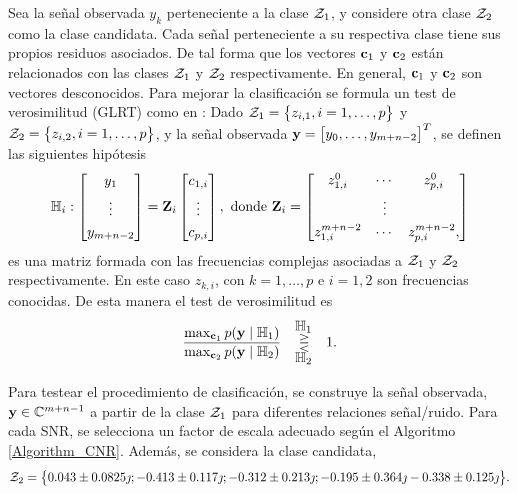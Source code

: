 			Sea la señal observada $y_k$ perteneciente a la clase $\mathcal{Z}_1$, y considere otra clase $\mathcal{Z}_2$ como la clase candidata. Cada señal perteneciente a su respectiva clase tiene sus propios residuos asociados. De tal forma que los vectores $\mathbf{c}_1$ y $\mathbf{c}_2$ están relacionados con las clases $\mathcal{Z}_1$ y $\mathcal{Z}_2$ respectivamente. En general, $\mathbf{c}_1$ y $\mathbf{c}_2$ son vectores desconocidos. Para mejorar la clasificación se formula un test de verosimilitud (GLRT) como en \cite{Mooney1998}: Dado $\mathcal{Z}_1= \big\{
			z_{i,1}, i=1,\ldots,p\big\}$ y $\mathcal{Z}_2= \big\{z_{i,2}, i=1,\ldots,p\big\}$, y la señal observada $\mathbf{y} = \big[y_0,\ldots,y_{m+n-2}\big]^T$, se definen las siguientes hipótesis
			\[ \mathbb{H}_i : \begin{bmatrix} y_1 \\[0.3em] \vdots\\[0.3em] y_{m+n-2}
			\end{bmatrix}= \mathbf{Z}_i\begin{bmatrix} c_{1,i} \\[0.3em] \vdots\\[0.3em] c_{p,i}
			\end{bmatrix}, \text{ donde } \mathbf{Z}_i = \begin{bmatrix} z_{1,i}^0 & \cdots & z_{p,i}^0\\[0.3em] & \vdots & \\[0.3em] z_{1,i}^{m+n-2} & \cdots & z_{p,i}^{m+n-2},
			\end{bmatrix}\]
			es una matriz formada con las frecuencias complejas asociadas a $\mathcal{Z}_1$ y $\mathcal{Z}_2$ respectivamente. En este caso $z_{k,i}$, con $k=1,\ldots, p$ e $i=1,2$ son frecuencias conocidas. De esta manera el test de verosimilitud es
			\[\frac{\max_{\mathbf{c}_1}p(\mathbf{y}\mid\mathbb{H}_1)}{\max_{\mathbf{c}_2}p(\mathbf{y}\mid\mathbb{H}_2)}\quad \begin{aligned} & \mathbb{H}_1 \\[-5pt]
			& \gtreqless\\[-5pt]
			& \mathbb{H}_2
			\end{aligned} \quad 1.\]
			
			Para testear el procedimiento de clasificación, se construye la señal observada, $\mathbf{y}\in\mathbb{C}^{m+n-1}$ a partir de la clase $\mathcal{Z}_1$ para diferentes relaciones señal/ruido. Para cada SNR, se selecciona un factor de escala adecuado según el Algoritmo \eqref{Algorithm_CNR}. Además, se considera la clase candidata,
			\begin{equation}
				\mathcal{Z}_2 = \big\{0.043\pm 0.0825\jmath; -0.413\pm 0.117\jmath;-0.312\pm 0.213\jmath;-0.195\pm 0.364\jmath -0.338\pm 0.125\jmath \big\}.
				\label{Eq:Set_Z2}
			\end{equation} 
			
